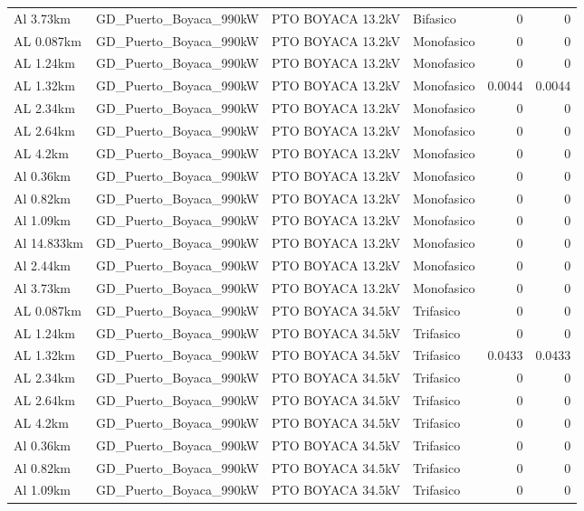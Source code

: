 \documentclass[11pt,a4paper]{article}
\begin{document}
\begin{longtable}{llllrr}
Al 3.73km & GD\_Puerto\_Boyaca\_990kW & PTO BOYACA 13.2kV & Bifasico & 0 & 0 \\
AL 0.087km & GD\_Puerto\_Boyaca\_990kW & PTO BOYACA 13.2kV & Monofasico & 0 & 0 \\
AL 1.24km & GD\_Puerto\_Boyaca\_990kW & PTO BOYACA 13.2kV & Monofasico & 0 & 0 \\
AL 1.32km & GD\_Puerto\_Boyaca\_990kW & PTO BOYACA 13.2kV & Monofasico & 0.0044 & 0.0044 \\
AL 2.34km & GD\_Puerto\_Boyaca\_990kW & PTO BOYACA 13.2kV & Monofasico & 0 & 0 \\
AL 2.64km & GD\_Puerto\_Boyaca\_990kW & PTO BOYACA 13.2kV & Monofasico & 0 & 0 \\
AL 4.2km & GD\_Puerto\_Boyaca\_990kW & PTO BOYACA 13.2kV & Monofasico & 0 & 0 \\
Al 0.36km & GD\_Puerto\_Boyaca\_990kW & PTO BOYACA 13.2kV & Monofasico & 0 & 0 \\
Al 0.82km & GD\_Puerto\_Boyaca\_990kW & PTO BOYACA 13.2kV & Monofasico & 0 & 0 \\
Al 1.09km & GD\_Puerto\_Boyaca\_990kW & PTO BOYACA 13.2kV & Monofasico & 0 & 0 \\
Al 14.833km & GD\_Puerto\_Boyaca\_990kW & PTO BOYACA 13.2kV & Monofasico & 0 & 0 \\
Al 2.44km & GD\_Puerto\_Boyaca\_990kW & PTO BOYACA 13.2kV & Monofasico & 0 & 0 \\
Al 3.73km & GD\_Puerto\_Boyaca\_990kW & PTO BOYACA 13.2kV & Monofasico & 0 & 0 \\
AL 0.087km & GD\_Puerto\_Boyaca\_990kW & PTO BOYACA 34.5kV & Trifasico & 0 & 0 \\
AL 1.24km & GD\_Puerto\_Boyaca\_990kW & PTO BOYACA 34.5kV & Trifasico & 0 & 0 \\
AL 1.32km & GD\_Puerto\_Boyaca\_990kW & PTO BOYACA 34.5kV & Trifasico & 0.0433 & 0.0433 \\
AL 2.34km & GD\_Puerto\_Boyaca\_990kW & PTO BOYACA 34.5kV & Trifasico & 0 & 0 \\
AL 2.64km & GD\_Puerto\_Boyaca\_990kW & PTO BOYACA 34.5kV & Trifasico & 0 & 0 \\
AL 4.2km & GD\_Puerto\_Boyaca\_990kW & PTO BOYACA 34.5kV & Trifasico & 0 & 0 \\
Al 0.36km & GD\_Puerto\_Boyaca\_990kW & PTO BOYACA 34.5kV & Trifasico & 0 & 0 \\
Al 0.82km & GD\_Puerto\_Boyaca\_990kW & PTO BOYACA 34.5kV & Trifasico & 0 & 0 \\
Al 1.09km & GD\_Puerto\_Boyaca\_990kW & PTO BOYACA 34.5kV & Trifasico & 0 & 0 \\

\end{longtable}
\end{document}
